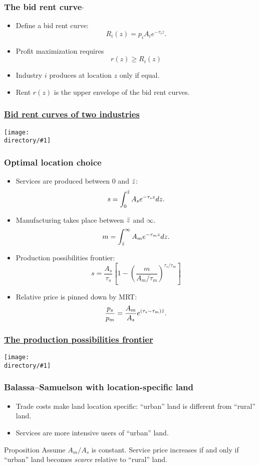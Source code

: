 \documentclass[compress,mathserif]{beamer}
\newcounter{perc}
\newcounter{percek}
\newcommand{\directory}{figures}
\newcommand{\widefigure}[2]{\begin{frame}\frametitle{\hyperlink{#1back}{#2}}\hypertarget{#1}{{\begin{center}\texttt{[image: \\directory/\#1]}\end{center}}}\end{frame}}
\renewcommand{\time}[1]{\addtocounter{percek}{#1}}
\begin{document}
\begin{frame}\frametitle{The bid rent curve$\cdot$}
\begin{itemize}
    \item Define a bid rent curve:
    \[
    R_i(z) = p_iA_i{e}^{-\tau_i z}.
    \]
    \item Profit maximization requires
    \[
    r(z)\ge R_i(z)
    \]
    \item Industry $i$ produces at location $z$ only if equal.
    \item Rent $r(z)$ is the upper envelope of the bid rent curves.
\end{itemize}
\end{frame}

\widefigure{bid-rent-2-exp}{Bid rent curves of two industries}
\time{3}

\begin{frame}\frametitle{Optimal location choice}
\begin{itemize}
\item Services are produced between $0$ and $\Bar z$:
\[
s = \int_0^{\Bar z}A_se^{-\tau_s z}dz.
\]
\item Manufacturing takes place between $\Bar z$ and $\infty$.
\[
m = \int_{\Bar z}^\infty A_me^{-\tau_m z}dz.
\]
\item Production possibilities frontier:
\[
s = \frac{A_s}{\tau_s}\left[1-\left(\frac{m}{A_m/\tau_m}\right)^{\tau_s/\tau_m}\right]
\]
\item Relative price is pinned down by MRT:
\[
\frac{p_s}{p_m} = \frac{A_m}{A_s}e^{(\tau_s-\tau_m)\Bar z}.
\]
\end{itemize}
\end{frame}

\widefigure{PPF-location}{The production possibilities frontier}



\begin{frame}\frametitle{Balassa--Samuelson with location-specific land}
\begin{itemize}
\item Trade costs make land location specific: ``urban'' land is different from ``rural'' land.
\item Services are more intensive users of ``urban'' land.
\end{itemize}

\begin{block}{Proposition}
Assume $A_m/A_s$ is constant. Service price increases if and only if ``urban'' land becomes \emph{scarce} relative to ``rural'' land.
\end{block}
\end{frame}
\end{document}
